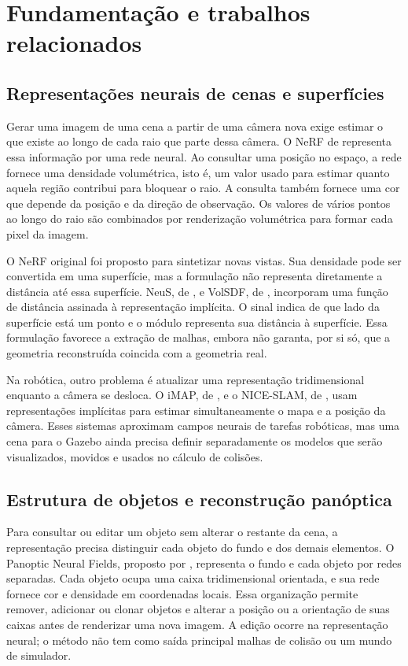 \chapter{Fundamentação e trabalhos relacionados}\label{cap:relacionados}

\section{Representações neurais de cenas e superfícies}

Gerar uma imagem de uma cena a partir de uma câmera nova exige estimar o que existe ao longo de cada raio que parte dessa câmera. O NeRF de \citet{mildenhall2020nerf} representa essa informação por uma rede neural. Ao consultar uma posição no espaço, a rede fornece uma densidade volumétrica, isto é, um valor usado para estimar quanto aquela região contribui para bloquear o raio. A consulta também fornece uma cor que depende da posição e da direção de observação. Os valores de vários pontos ao longo do raio são combinados por renderização volumétrica para formar cada pixel da imagem.

O NeRF original foi proposto para sintetizar novas vistas. Sua densidade pode ser convertida em uma superfície, mas a formulação não representa diretamente a distância até essa superfície. NeuS, de \citet{wang2021neus}, e VolSDF, de \citet{yariv2021volsdf}, incorporam uma função de distância assinada à representação implícita. O sinal indica de que lado da superfície está um ponto e o módulo representa sua distância à superfície. Essa formulação favorece a extração de malhas, embora não garanta, por si só, que a geometria reconstruída coincida com a geometria real.

Na robótica, outro problema é atualizar uma representação tridimensional enquanto a câmera se desloca. O iMAP, de \citet{sucar2021imap}, e o NICE-SLAM, de \citet{zhu2022niceslam}, usam representações implícitas para estimar simultaneamente o mapa e a posição da câmera. Esses sistemas aproximam campos neurais de tarefas robóticas, mas uma cena para o Gazebo ainda precisa definir separadamente os modelos que serão visualizados, movidos e usados no cálculo de colisões.

\section{Estrutura de objetos e reconstrução panóptica}

Para consultar ou editar um objeto sem alterar o restante da cena, a representação precisa distinguir cada objeto do fundo e dos demais elementos. O Panoptic Neural Fields, proposto por \citet{kundu2022panoptic}, representa o fundo e cada objeto por redes separadas. Cada objeto ocupa uma caixa tridimensional orientada, e sua rede fornece cor e densidade em coordenadas locais. Essa organização permite remover, adicionar ou clonar objetos e alterar a posição ou a orientação de suas caixas antes de renderizar uma nova imagem. A edição ocorre na representação neural; o método não tem como saída principal malhas de colisão ou um mundo de simulador.

